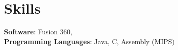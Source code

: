 \section{Skills}
 \begin{itemize}[leftmargin=0.15in, label={}]
    \small{\item{
     \textbf{Software}{: Fusion 360, } \\
     \textbf{Programming Languages}{: Java, C, Assembly (MIPS)} \\
    }}
 \end{itemize}
